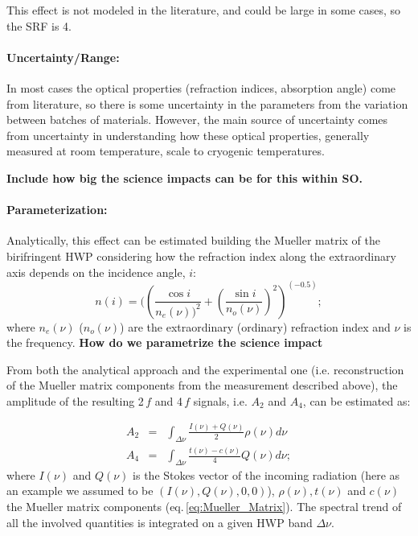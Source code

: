 This effect is not modeled in the literature, and could be large in some cases, so the SRF is 4.

\paragraph{Uncertainty/Range:}
In most cases the optical properties (refraction indices, absorption angle) come from literature, so there is some uncertainty in the parameters from the variation between batches of materials. However, the main source of uncertainty comes from uncertainty in understanding how these optical properties, generally measured at room temperature, scale to cryogenic temperatures.

\textbf{Include how big the science impacts can be for this within SO.}

\paragraph{Parameterization:}
Analytically, this effect can be estimated building the Mueller matrix of the birifringent HWP considering how the refraction index along the extraordinary axis depends on the incidence angle, $i$:
\begin{equation}
n(i)=((\frac{\cos{i}}{n_e(\nu))^2}+(\frac{\sin{i}}{n_o(\nu)})^2)^{(-0.5)};
\end{equation}
where $n_e(\nu)$ ($n_o(\nu)$) are the extraordinary (ordinary) refraction index and $\nu$ is the frequency. \textbf{How do we parametrize the science impact}

From both the analytical approach and the experimental one (i.e. reconstruction of the Mueller matrix components from the measurement described above), the amplitude of the resulting 2$\,f$ and 4$\,f$ signals, i.e. $A_2$ and $A_4$, can be estimated as:

\begin{eqnarray}
  A_2 &=& \int_{\Delta\nu} \frac{I(\nu)+Q(\nu)}{2} \rho(\nu) d\nu\\ \label{A2}
  A_4 &=& \int_{\Delta\nu} \frac{t(\nu)-c(\nu)}{4} Q(\nu) d\nu; \label{A4}
\end{eqnarray}
where $I(\nu)$ and $Q(\nu)$ is the Stokes vector of the incoming radiation (here as an example we assumed to be $(I(\nu), Q(\nu),0,0)$),
$\rho(\nu), t(\nu)$ and $c(\nu)$ the Mueller matrix components (eq.\,\ref{eq:Mueller_Matrix}). The spectral trend of all the involved quantities is integrated on a given HWP band $\Delta\nu$.



